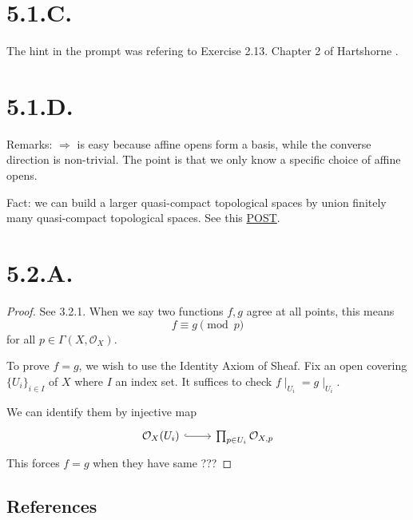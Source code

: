 \section{5.1.C.}

The hint in the prompt was refering to Exercise 2.13.  Chapter 2 of Hartshorne \cite{hartshorne2013algebraic}.

\section{5.1.D.}

Remarks: $\Rightarrow$ is easy because affine opens form a basis, while the converse direction is non-trivial. The point is that we only know a specific choice of affine opens. 

Fact: we can build a larger quasi-compact topological spaces by union finitely many quasi-compact topological spaces. See this \href{https://math.stackexchange.com/questions/816938/quasicompact-scheme-are-finite-union-of-affine-scheme}{POST}.

\section{5.2.A.}

\begin{proof}
    
See 3.2.1. When we say two functions $f,g$ agree at all points, this means 
\[f\equiv g\pmod{p}\] for all $p\in \Gamma(X,\mathcal O_X)$.    

To prove $f=g$, we wish to use the Identity Axiom of Sheaf. Fix an open covering $\{U_i\}_{i\in I}$ of $X$ where $I$ an index set. It suffices to check $f\mid_{U_i}=g\mid_{U_i}$.

We can identify them by injective map 
\[\begin{tikzcd}
	{\mathcal O_X(U_i)} & {\prod_{p\in U_i}\mathcal O_{X,p}}
	\arrow[hook, from=1-1, to=1-2]
\end{tikzcd}\]
This forces $f=g$ when they have same ???

\end{proof}

\subsection{References}

